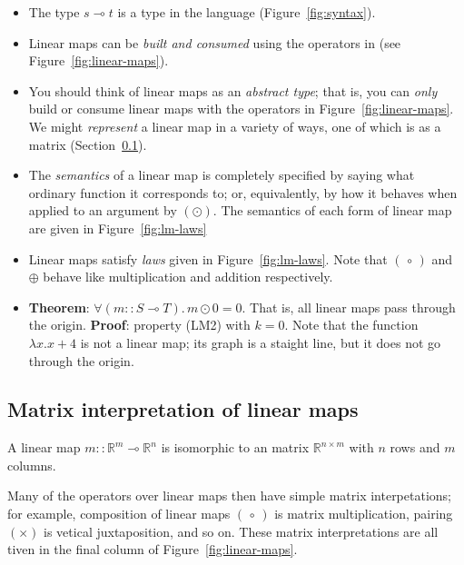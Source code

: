 \documentclass[sigplan,review]{acmart}
\newcommand{\linto}{\multimap}     %
\newcommand{\real}{\mathbb{R}}       %
\newcommand{\lmapply}{\odot}   %
\newcommand{\lmcomp}{\,\circ\,}   %
\newcommand{\lmpair}{\times}         %
\newcommand{\lmadd}{\oplus}        %
\begin{document}
\begin{itemize}
\item The type $s \linto t$ is a type in the language (Figure~\ref{fig:syntax}).
\item Linear maps can be \emph{built and consumed} using the
  operators in (see Figure~\ref{fig:linear-maps}).
\item 
  You should think of linear maps as an \emph{abstract type}; that is,
  you can \emph{only} build or consume linear maps with
  the operators in Figure~\ref{fig:linear-maps}.  We might \emph{represent} a linear map in a variety
  of ways, one of which is as a matrix (Section~\ref{sec:matrix-rep}).
  \item The \emph{semantics} of a linear map is completely specified by saying
    what ordinary function it corresponds to; or, equivalently, by how it behaves when applied
    to an argument by $(\lmapply)$.  The semantics of each form of linear map are given in Figure~\ref{fig:lm-laws}
  \item Linear maps satisfy \emph{laws} given in Figure~\ref{fig:lm-laws}.  Note that $(\lmcomp)$ and $\lmadd$ behave
    like multiplication and addition respectively.

\item {\bf Theorem}: $\forall (m :: S \linto T).\, m \lmapply 0 = 0$.  That is, all linear maps
pass through the origin.  {\bf Proof}: property (LM2) with $k=0$.  Note that the function
$\lambda x. x+4$ is not a linear map; its graph is a staight line, but it does not
go through the origin.

\end{itemize}


\subsection{Matrix interpretation of linear maps} \label{sec:matrix-rep}

\def\lmtomat{\mathcal M}%

A linear map $m :: \real^m \linto \real^n$ is isomorphic to an matrix $\real^{n \times m}$ with $n$ rows and $m$ columns.

Many of the operators over linear maps then have simple matrix interpetations; for example, composition of
linear maps $(\lmcomp)$ is matrix multiplication, pairing $(\lmpair)$ is vetical juxtaposition, and so on.
These matrix interpretations are all tiven in the final column of Figure~\ref{fig:linear-maps}.
\end{document}
